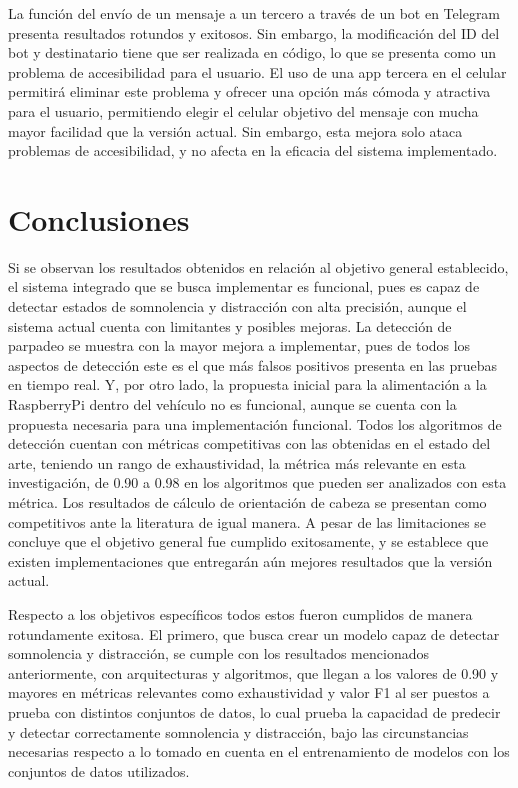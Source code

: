 La función del envío de un mensaje a un tercero a través de un bot en Telegram presenta resultados rotundos y exitosos. Sin embargo, la modificación del ID del bot y destinatario tiene que ser realizada en código, lo que se presenta como un problema de accesibilidad para el usuario. El uso de una app tercera en el celular permitirá eliminar este problema y ofrecer una opción más cómoda y atractiva para el usuario, permitiendo elegir el celular objetivo del mensaje con mucha mayor facilidad que la versión actual. Sin embargo, esta mejora solo ataca problemas de accesibilidad, y no afecta en la eficacia del sistema implementado.

\section{Conclusiones}
Si se observan los resultados obtenidos en relación al objetivo general establecido, el sistema integrado que se busca implementar es funcional, pues es capaz de detectar estados de somnolencia y distracción con alta precisión, aunque el sistema actual cuenta con limitantes y posibles mejoras. La detección de parpadeo se muestra con la mayor mejora a implementar, pues de todos los aspectos de detección este es el que más falsos positivos presenta en las pruebas en tiempo real. Y, por otro lado, la propuesta inicial para la alimentación a la RaspberryPi dentro del vehículo no es funcional, aunque se cuenta con la propuesta necesaria para una implementación funcional. Todos los algoritmos de detección cuentan con métricas competitivas con las obtenidas en el estado del arte, teniendo un rango de exhaustividad, la métrica más relevante en esta investigación, de 0.90 a 0.98 en los algoritmos que pueden ser analizados con esta métrica. Los resultados de cálculo de orientación de cabeza se presentan como competitivos ante la literatura de igual manera. A pesar de las limitaciones se concluye que el objetivo general fue cumplido exitosamente, y se establece que existen implementaciones que entregarán aún mejores resultados que la versión actual. 

Respecto a los objetivos específicos todos estos fueron cumplidos de manera rotundamente exitosa. El primero, que busca crear un modelo capaz de detectar somnolencia y distracción, se cumple con los resultados mencionados anteriormente, con arquitecturas y algoritmos, que llegan a los valores de 0.90 y mayores en métricas relevantes como exhaustividad y valor F1 al ser puestos a prueba con distintos conjuntos de datos, lo cual prueba la capacidad de predecir y detectar correctamente somnolencia y distracción, bajo las circunstancias necesarias respecto a lo tomado en cuenta en el entrenamiento de modelos con los conjuntos de datos utilizados. 

